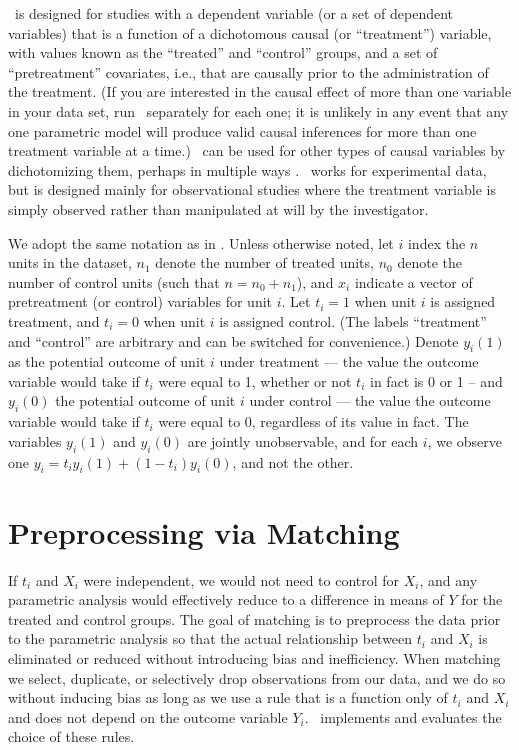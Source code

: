 
\MatchIt\ is designed for studies with a dependent variable (or a set
of dependent variables) that is a function of a dichotomous causal (or
``treatment'') variable, with values known as the ``treated'' and
``control'' groups, and a set of ``pretreatment'' covariates, i.e.,
that are causally prior to the administration of the treatment.  (If
you are interested in the causal effect of more than one variable in
your data set, run \MatchIt\ separately for each one; it is unlikely
in any event that any one parametric model will produce valid causal
inferences for more than one treatment variable at a time.)  \MatchIt\
can be used for other types of causal variables by dichotomizing them,
perhaps in multiple ways \citep[see also][]{ImaDyk04}.  \MatchIt\
works for experimental data, but is designed mainly for observational
studies where the treatment variable is simply observed rather than
manipulated at will by the investigator.

We adopt the same notation as in \citet*{HoImaKin05}. Unless otherwise
noted, let $i$ index the $n$ units in the dataset, $n_1$ denote the
number of treated units, $n_0$ denote the number of control units
(such that $n=n_0+n_1$), and $x_i$ indicate a vector of pretreatment
(or control) variables for unit $i$.  Let $t_i=1$ when unit $i$ is
assigned treatment, and $t_i=0$ when unit $i$ is assigned control.
(The labels ``treatment'' and ``control'' are arbitrary and can be
switched for convenience.)  Denote $y_i(1)$ as the potential outcome
of unit $i$ under treatment --- the value the outcome variable would
take if $t_i$ were equal to 1, whether or not $t_i$ in fact is 0 or 1
-- and $y_i(0)$ the potential outcome of unit $i$ under control ---
the value the outcome variable would take if $t_i$ were equal to 0,
regardless of its value in fact.  The variables $y_i(1)$ and $y_i(0)$
are jointly unobservable, and for each $i$, we observe one
$y_i=t_iy_i(1)+(1-t_i)y_i(0)$, and not the other.

\section{Preprocessing via Matching}

If $t_i$ and $X_i$ were independent, we would not need to control for
$X_i$, and any parametric analysis would effectively reduce to a
difference in means of $Y$ for the treated and control groups.  The
goal of matching is to preprocess the data prior to the parametric
analysis so that the actual relationship between $t_i$ and $X_i$ is
eliminated or reduced without introducing bias and inefficiency.  When
matching we select, duplicate, or selectively drop observations from
our data, and we do so without inducing bias as long as we use a rule
that is a function only of $t_i$ and $X_i$ and does not depend on the
outcome variable $Y_i$.  \MatchIt\ implements and evaluates the choice
of these rules.  

